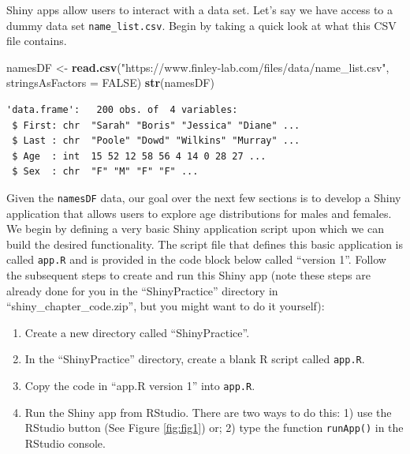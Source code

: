 \documentclass[
]{krantz}
\makeatletter
\newenvironment{Shaded}{\begin{snugshade}}{\end{snugshade}}
\newcommand{\DataTypeTok}[1]{\textcolor[rgb]{0.27,0.27,0.27}{#1}}
\newcommand{\KeywordTok}[1]{\textcolor[rgb]{0.27,0.27,0.27}{\textbf{#1}}}
\newcommand{\NormalTok}[1]{#1}
\newcommand{\OtherTok}[1]{\textcolor[rgb]{0.37,0.37,0.37}{#1}}
\newcommand{\StringTok}[1]{\textcolor[rgb]{0.5,0.5,0.5}{#1}}
\providecommand{\tightlist}{%
  \setlength{\itemsep}{0pt}\setlength{\parskip}{0pt}}
\newenvironment{kframe}{%
\medskip{}
\setlength{\fboxsep}{.8em}
 \def\at@end@of@kframe{}%
 \ifinner\ifhmode%
  \def\at@end@of@kframe{\end{minipage}}%
  \begin{minipage}{\columnwidth}%
 \fi\fi%
 \def\FrameCommand##1{\hskip\@totalleftmargin \hskip-\fboxsep
 \colorbox{shadecolor}{##1}\hskip-\fboxsep
     \hskip-\linewidth \hskip-\@totalleftmargin \hskip\columnwidth}%
 \MakeFramed {\advance\hsize-\width
   \@totalleftmargin\z@ \linewidth\hsize
   \@setminipage}}%
 {\par\unskip\endMakeFramed%
 \at@end@of@kframe}
\renewenvironment{Shaded}{\begin{kframe}}{\end{kframe}}
\makeatother
\begin{document}
Shiny apps allow users to interact with a data set. Let's say we have access to a dummy data set \texttt{name\_list.csv}. Begin by taking a quick look at what this CSV file contains.

\begin{Shaded}
\begin{Highlighting}[]
\NormalTok{namesDF \textless{}{-}}\StringTok{ }\KeywordTok{read.csv}\NormalTok{(}\StringTok{"https://www.finley{-}lab.com/files/data/name\_list.csv"}\NormalTok{, }
                    \DataTypeTok{stringsAsFactors =} \OtherTok{FALSE}\NormalTok{)}
\KeywordTok{str}\NormalTok{(namesDF)}
\end{Highlighting}
\end{Shaded}

\begin{verbatim}
'data.frame':	200 obs. of  4 variables:
 $ First: chr  "Sarah" "Boris" "Jessica" "Diane" ...
 $ Last : chr  "Poole" "Dowd" "Wilkins" "Murray" ...
 $ Age  : int  15 52 12 58 56 4 14 0 28 27 ...
 $ Sex  : chr  "F" "M" "F" "F" ...
\end{verbatim}

Given the \texttt{namesDF} data, our goal over the next few sections is to develop a Shiny application that allows users to explore age distributions for males and females. We begin by defining a very basic Shiny application script upon which we can build the desired functionality. The script file that defines this basic application is called \texttt{app.R} and is provided in the code block below called ``version 1''. Follow the subsequent steps to create and run this Shiny app (note these steps are already done for you in the ``ShinyPractice'' directory in ``shiny\_chapter\_code.zip'', but you might want to do it yourself):

\begin{enumerate}
\def\labelenumi{\arabic{enumi}.}
\tightlist
\item
  Create a new directory called ``ShinyPractice''.
\item
  In the ``ShinyPractice'' directory, create a blank R script called \texttt{app.R}.
\item
  Copy the code in ``app.R version 1'' into \texttt{app.R}.
\item
  Run the Shiny app from RStudio. There are two ways to do this: 1) use the RStudio button (See Figure \ref{fig:fig1}) or; 2) type the function \texttt{runApp()} in the RStudio console.
\end{enumerate}
\end{document}
